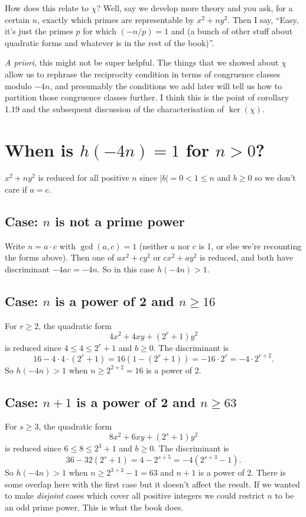 How does this relate to $\chi$? Well, say we develop more theory and you ask, for a certain $n$, exactly which primes are representable by $x^2+ny^2$. Then I say, ``Easy, it's just the primes $p$ for which $(-n/p)=1$ and (a bunch of other stuff about quadratic forms and whatever is in the rest of the book)''.

\emph{A priori}, this might not be super helpful. The things that we showed about $\chi$ allow us to rephrase the reciprocity condition in terms of congruence classes modulo $-4n$, and presumably the conditions we add later will tell us how to partition those congruence classes further. I think this is the point of corollary 1.19 and the subsequent discussion of the characterisation of $\ker(\chi)$.

\section{When is $h(-4n)=1$ for $n>0$?}

$x^2+ny^2$ is reduced for all positive $n$ since $|b|=0< 1\leq n$ and $b\geq 0$ so we don't care if $a=c$.

\subsection{Case: $n$ is not a prime power}

Write $n=a\cdot c$ with $\gcd(a,c)=1$ (neither $a$ nor $c$ is 1, or else we're recounting the forms above). Then one of $ax^2+cy^2$ or $cx^2+ay^2$ is reduced, and both have discriminant $-4ac=-4n$. So in this case $h(-4n)>1$.

\subsection{Case: $n$ is a power of 2 and $n\geq 16$}

For $r\geq 2$, the quadratic form
\[4x^2+4xy+(2^r+1)y^2\]
is reduced since $4\leq 4\leq 2^r+1$ and $b\geq 0$. The discriminant is
\[16-4\cdot 4\cdot (2^r+1)=16(1-(2^r+1))=-16\cdot 2^r=-4\cdot 2^{r+2}.\]
So $h(-4n)>1$ when $n\geq 2^{2+2}=16$ is a power of 2.

\subsection{Case: $n+1$ is a power of 2 and $n\geq 63$}

For $s\geq 3$, the quadratic form
\[8x^2+6xy+(2^s+1)y^2\]
is reduced since $6\leq 8\leq 2^3+1$ and $b\geq 0$. The discriminant is
\[36-32(2^s+1)=4-2^{s+5}=-4(2^{s+3}-1).\]
So $h(-4n)>1$ when $n\geq 2^{3+3}-1=63$ and $n+1$ is a power of 2. There is some overlap here with the first case but it doesn't affect the result. If we wanted to make \emph{disjoint} cases which cover all positive integers we could restrict $n$ to be an odd prime power. This is what the book does.

